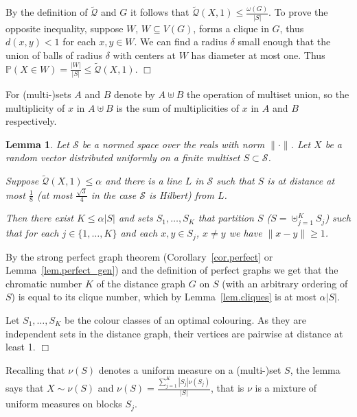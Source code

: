 \documentclass{article}
\newenvironment{proof}{\noindent{\bf Proof}}{\hspace*{\fill}$\Box$}
\newtheorem{lemma} [theorem] {Lemma}\newtheorem{attempt} [theorem] {Attempt}\newtheorem{corollary} [theorem] {Corollary}\newtheorem{prop} [theorem] {Proposition}\newtheorem{definition} [theorem] {Definition}\newtheorem{remark} [theorem] {Remark}\newtheorem{conjecture} [theorem] {Conjecture}\newtheorem{claim} [theorem] {Claim}
\newcommand{\pr}{\mathbb P}
\newcommand{\concdiam}{\tilde{\mathcal{Q}}}
\begin{document}
\begin{proof}
    By the definition of $\concdiam$ and $G$ it follows that $\concdiam(X, 1) \le \frac {\omega(G)} {|S|}$.
To prove the opposite inequality, suppose $W$, $W \subseteq V(G)$, forms a clique in $G$, thus $d(x,y) < 1$
    for each $x,y \in W$. We can find a radius $\delta$ small enough that 
    the union of balls of radius $\delta$ with centers at $W$ has diameter at most one.
    Thus $\pr(X \in W) = \frac{|W|} {|S|} \le \concdiam(X,1)$.
\end{proof}

\medskip
For (multi-)sets $A$ and $B$ denote by $A \uplus B$ the operation of multiset union, so the multiplicity of $x$
in $A \uplus B$ is the sum of multiplicities of $x$ in $A$ and $B$ respectively.

\begin{lemma}\label{lem.decomposition}
    Let $\mathcal{S}$ be a normed space over the reals with norm $\|\cdot\|$.
Let $X$ be a random vector distributed uniformly on a finite multiset $S \subset \mathcal{S}$.

    Suppose $\concdiam(X, 1) \le \alpha$ and there is a line $L$ in $\mathcal{S}$ such that
    $S$ is at distance at most $\frac 1 8$ (at most $\frac {\sqrt 3} 4$ in the case $\mathcal{S}$ is Hilbert) from $L$.

Then there exist $K \le \alpha |S|$ and
    sets $S_1, \dots, S_K$ that partition $S$ ($S=\uplus_{j=1}^K S_j$) such that
    for each $j \in \{1, \dots, K\}$ and each $x,y \in S_j$, $x \ne y$ we have $\|x - y \| \ge 1$.
\end{lemma}

\begin{proof}
By the strong perfect graph theorem (Corollary~\ref{cor.perfect} or Lemma~\ref{lem.perfect_gen}) and the definition of perfect graphs
    we get that the chromatic number $K$ of the distance graph $G$ on $S$ (with an arbitrary ordering of $S$) is equal to its clique number,
    which by Lemma~\ref{lem.cliques} is at most $\alpha |S|$. 

    Let $S_1, \dots, S_K$ be the colour classes of an optimal colouring. As they are independent
    sets in the distance graph, their vertices are pairwise at distance at least 1.
\end{proof}

\medskip

Recalling that $\nu(S)$ denotes a uniform measure on a (multi-)set $S$, the lemma says that 
$X \sim \nu(S)$ and $\nu(S) = \frac{\sum_{j=1}^K |S_j| \nu(S_j)} {|S|}$, that is $\nu$ is a
mixture of uniform measures on blocks $S_j$.
\end{document}
